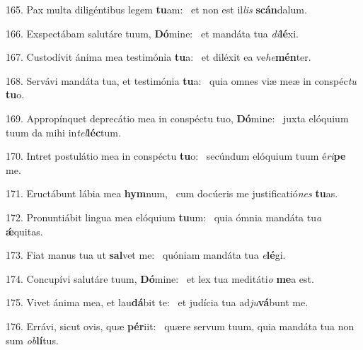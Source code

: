 165. Pax multa diligéntibus legem \textbf{tu}am: \ast\  et non est il\textit{lis} \textbf{scán}dalum.\

166. Exspectábam salutáre tuum, \textbf{Dó}mine: \ast\  et mandáta tua \textit{di}\textbf{lé}xi.\

167. Custodívit ánima mea testimónia \textbf{tu}a: \ast\  et diléxit ea ve\textit{he}\textbf{mén}ter.\

168. Servávi mandáta tua, et testimónia \textbf{tu}a: \ast\  quia omnes viæ meæ in conspéc\textit{tu} \textbf{tu}o.\

169. Appropínquet deprecátio mea in conspéctu tuo, \textbf{Dó}mine: \ast\  juxta elóquium tuum da mihi in\textit{tel}\textbf{léc}tum.\

170. Intret postulátio mea in conspéctu \textbf{tu}o: \ast\  secúndum elóquium tuum é\textit{ri}\textbf{pe} me.\

171. Eructábunt lábia mea \textbf{hym}num, \ast\  cum docúeris me justificatió\textit{nes} \textbf{tu}as.\

172. Pronuntiábit lingua mea elóquium \textbf{tu}um: \ast\  quia ómnia mandáta tu\textit{a} \textbf{ǽ}quitas.\

173. Fiat manus tua ut \textbf{sal}vet me: \ast\  quóniam mandáta tua \textit{e}\textbf{lé}gi.\

174. Concupívi salutáre tuum, \textbf{Dó}mine: \ast\  et lex tua meditáti\textit{o} \textbf{me}a est.\

175. Vivet ánima mea, et lau\textbf{dá}bit te: \ast\  et judícia tua ad\textit{ju}\textbf{vá}bunt me.\

176. Errávi, sicut ovis, quæ \textbf{pér}iit: \ast\  quære servum tuum, quia mandáta tua non sum \textit{ob}\textbf{lí}tus.\

